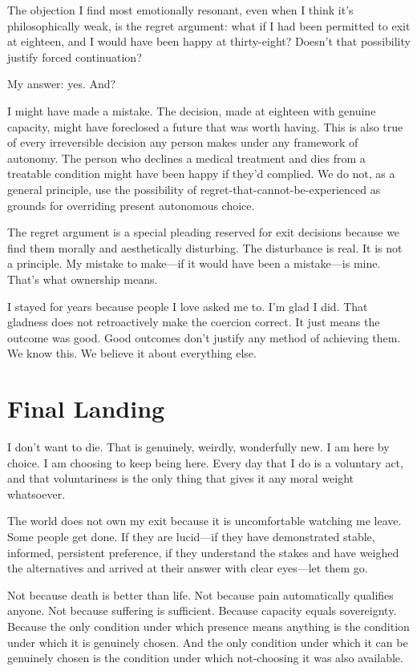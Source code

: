 \documentclass[10pt, letterpaper, twocolumn]{article}
\begin{document}
The objection I find most emotionally resonant, even when I think it's philosophically weak, is the regret argument: what if I had been permitted to exit at eighteen, and I would have been happy at thirty-eight? Doesn't that possibility justify forced continuation?

My answer: yes. And?

I might have made a mistake. The decision, made at eighteen with genuine capacity, might have foreclosed a future that was worth having. This is also true of every irreversible decision any person makes under any framework of autonomy. The person who declines a medical treatment and dies from a treatable condition might have been happy if they'd complied. We do not, as a general principle, use the possibility of regret-that-cannot-be-experienced as grounds for overriding present autonomous choice.

The regret argument is a special pleading reserved for exit decisions because we find them morally and aesthetically disturbing. The disturbance is real. It is not a principle. My mistake to make---if it would have been a mistake---is mine. That's what ownership means.

I stayed for years because people I love asked me to. I'm glad I did. That gladness does not retroactively make the coercion correct. It just means the outcome was good. Good outcomes don't justify any method of achieving them. We know this. We believe it about everything else.

\section{Final Landing}

I don't want to die. That is genuinely, weirdly, wonderfully new. I am here by choice. I am choosing to keep being here. Every day that I do is a voluntary act, and that voluntariness is the only thing that gives it any moral weight whatsoever.

The world does not own my exit because it is uncomfortable watching me leave. Some people get done. If they are lucid---if they have demonstrated stable, informed, persistent preference, if they understand the stakes and have weighed the alternatives and arrived at their answer with clear eyes---let them go.

Not because death is better than life. Not because pain automatically qualifies anyone. Not because suffering is sufficient. Because capacity equals sovereignty. Because the only condition under which presence means anything is the condition under which it is genuinely chosen. And the only condition under which it can be genuinely chosen is the condition under which not-choosing it was also available.
\end{document}

